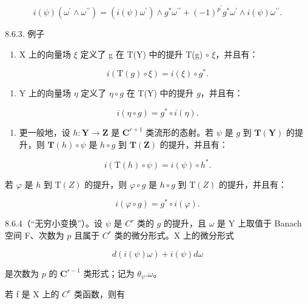 \[
i (\psi) \left(\omega^ {\prime} \wedge \omega^ {\prime \prime}\right) = (i (\psi) \omega^ {\prime}) \wedge g ^ {*} \omega^ {\prime \prime} + (- 1) ^ {p ^ {\prime}} g ^ {*} \omega^ {\prime} \wedge i (\psi) \omega^ {\prime \prime}.\tag{2}
\]

8.6.3. 例子

\begin{enumerate}
\def\labelenumi{\alph{enumi})}
\tightlist
\item
  X 上的向量场 \(\xi\) 定义了 g 在 T(Y) 中的提升 T(g) \(\circ\) \(\xi\)，并且有：
\end{enumerate}

\[
i (\mathrm{T} (g) \circ \xi) = i (\xi) \circ g ^ {*}.\tag{3}
\]

\begin{enumerate}
\def\labelenumi{\alph{enumi})}
\setcounter{enumi}{1}
\tightlist
\item
  Y 上的向量场 \(\eta\) 定义了 \(\eta \circ g\) 在 T(Y) 中的提升 \(g\)，并且有：
\end{enumerate}

\[
i (\eta \circ g) = g ^ {*} \circ i (\eta).\tag{4}
\]

\begin{enumerate}
\def\labelenumi{\alph{enumi})}
\setcounter{enumi}{2}
\tightlist
\item
  更一般地，设 \(h: \mathbf{Y} \to \mathbf{Z}\) 是 \(\mathbf{C}^{r+1}\) 类流形的态射。若 \(\psi\) 是 \(g\) 到 \(\mathbf{T}(\mathbf{Y})\) 的提升，则 \(\mathbf{T}(h) \circ \psi\) 是 \(h \circ g\) 到 \(\mathbf{T}(\mathbf{Z})\) 的提升，并且有：
\end{enumerate}

\[
i (\mathrm{T} (h) \circ \psi) = i (\psi) \circ h ^ {*}.\tag{5}
\]

若 \(\varphi\) 是 \(h\) 到 \(\mathrm{T}(Z)\) 的提升，则 \(\varphi \circ g\) 是 \(h \circ g\) 到 \(\mathrm{T}(Z)\) 的提升，并且有：

\[
i (\varphi \circ g) = g ^ {*} \circ i (\varphi).\tag{6}
\]

8.6.4（“无穷小变换”）。设 \(\psi\) 是 \(C^r\) 类的 \(g\) 的提升，且 \(\omega\) 是 Y 上取值于 Banach 空间 F、次数为 \(p\) 且属于 \(C^r\) 类的微分形式。X 上的微分形式

\[
d (i (\psi) \omega) + i (\psi) d \omega\tag{7}
\]

是次数为 \(p\) 的 \(\mathbf{C}^{r-1}\) 类形式；记为 \(\theta_{\psi}.\omega\)。

若 f 是 X 上的 \(C^{r}\) 类函数，则有

